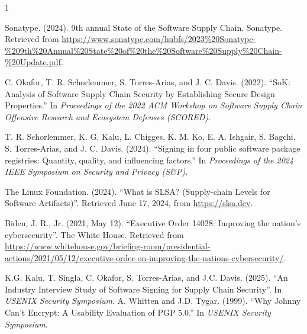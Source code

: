 \documentclass{IEEEcsmagTechrxiv}
\begin{document}
\def\refname{REFERENCES}

\begin{thebibliography}{1}

    
    Sonatype. (2024). 9th annual State of the Software Supply Chain. Sonatype. Retrieved from \url{https://www.sonatype.com/hubfs/2023%20Sonatype-%209th%20Annual%20State%20of%20the%20Software%20Supply%20Chain-%20Update.pdf}.

	C. Okafor, T. R. Schorlemmer, S. Torres-Arias, and J. C. Davis. (2022).
	``SoK: Analysis of Software Supply Chain Security by Establishing Secure Design Properties.''
    In
	{\it Proceedings of the 2022 ACM Workshop on Software Supply Chain Offensive Research and Ecosystem Defenses (SCORED)}.

	T. R. Schorlemmer, K. G. Kalu, L. Chigges, K. M. Ko, E. A. Ishgair, S. Bagchi, S. Torres-Arias, and J. C. Davis. (2024).
	``Signing in four public software package registries: Quantity, quality, and influencing factors.''
    In {\it Proceedings of the 2024 IEEE Symposium on Security and Privacy (S\&P)}.

    The Linux Foundation. (2024).
    ``What is SLSA? (Supply-chain Levels for Software Artifacts)''.
    Retrieved June 17, 2024, from \url{https://slsa.dev}.
    
    Biden, J. R., Jr. (2021, May 12).
    ``Executive Order 14028: Improving the nation's cybersecurity''.
    The White House.
    Retrieved from \url{https://www.whitehouse.gov/briefing-room/presidential-actions/2021/05/12/executive-order-on-improving-the-nations-cybersecurity/}.

    K.G. Kalu, T. Singla, C. Okafor, S. Torres-Arias, and J.C. Davis. (2025).
    ``An Industry Interview Study of Software Signing for Supply Chain Security''.
    In \textit{USENIX Security Symposium}.
    A. Whitten and J.D. Tygar. (1999).
    ``Why Johnny Can't Encrypt: A Usability Evaluation of PGP 5.0.''
    In \textit{USENIX Security Symposium}.


\end{thebibliography}
\end{document}
